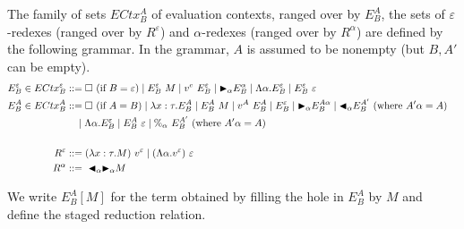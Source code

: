 \begin{definition}
	The family of sets $ECtx^A_B$ of evaluation contexts, ranged over by $E^A_B$,
	the sets of $\varepsilon$-redexes (ranged over by $R^\varepsilon$) and $\alpha$-redexes (ranged over by $R^\alpha$) are defined by the following grammar.
	In the grammar, $A$ is assumed to be nonempty (but $B,A'$ can be empty).
	\begin{align*}
		E^\varepsilon_B \in ECtx^\varepsilon_B & ::= \square\ (\text{if\ } B = \varepsilon) \mid E^\varepsilon_B\ M \mid v^e\ E^\varepsilon_B
		\mid {\mathop{\blacktriangleright}}_\alpha E^\alpha_B \mid \Lambda\alpha.E^\varepsilon_B
		\mid E^\varepsilon_B\ \varepsilon                                                                                                       \\
		E^A_B \in ECtx^A_B                     & ::= \square\ (\text{if } A = B) \mid \lambda x:\tau.E^A_B \mid E^A_B\ M \mid v^A\ E^A_B
		\mid E^\varepsilon_B \mid {\mathop{\blacktriangleright}}_\alpha E^{A\alpha}_B
		\mid {\mathop{\blacktriangleleft}}_\alpha E^{A'}_B \ (\text{where } A'\alpha = A)                                                                                \\
		                                       & \quad \mid \Lambda\alpha.E^\varepsilon_B
		\mid E^A_B\ \varepsilon \mid \%_\alpha\ E^{A'}_B \ (\text{where } A'\alpha = A)                                                         \\
		\\
		R^\varepsilon                          & ::= (\lambda x:\tau.M)\ v^\varepsilon \mid (\Lambda\alpha.v^\varepsilon)\ \varepsilon        & \\
		R^\alpha                               & ::=\ {\mathop{\blacktriangleleft}}_\alpha {\mathop{\blacktriangleright}}_\alpha M                                                                & \\\end{align*}
\end{definition}


We write $E^A_B[M]$ for the term obtained by filling the hole in $E^A_B$ by $M$
and define the staged reduction relation.

